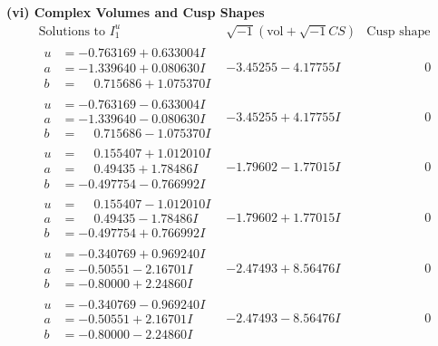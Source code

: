 \documentclass[1p]{elsarticle_modified}
\theoremstyle{definition}
\newcommand{\I}{\sqrt{-1}}
\begin{document}
\newpage\flushleft \textbf{(vi) Complex Volumes and Cusp Shapes}
$$\begin{array}{c|c|c}  
\text{Solutions to }I^u_{1}& \I (\text{vol} + \sqrt{-1}CS) & \text{Cusp shape}\\
 \hline 
\begin{aligned}
u &= -0.763169 + 0.633004 I \\
a &= -1.339640 + 0.080630 I \\
b &= \phantom{-}0.715686 + 1.075370 I\end{aligned}
 & -3.45255 - 4.17755 I & \phantom{-0.000000 } 0 \\ \hline\begin{aligned}
u &= -0.763169 - 0.633004 I \\
a &= -1.339640 - 0.080630 I \\
b &= \phantom{-}0.715686 - 1.075370 I\end{aligned}
 & -3.45255 + 4.17755 I & \phantom{-0.000000 } 0 \\ \hline\begin{aligned}
u &= \phantom{-}0.155407 + 1.012010 I \\
a &= \phantom{-}0.49435 + 1.78486 I \\
b &= -0.497754 - 0.766992 I\end{aligned}
 & -1.79602 - 1.77015 I & \phantom{-0.000000 } 0 \\ \hline\begin{aligned}
u &= \phantom{-}0.155407 - 1.012010 I \\
a &= \phantom{-}0.49435 - 1.78486 I \\
b &= -0.497754 + 0.766992 I\end{aligned}
 & -1.79602 + 1.77015 I & \phantom{-0.000000 } 0 \\ \hline\begin{aligned}
u &= -0.340769 + 0.969240 I \\
a &= -0.50551 - 2.16701 I \\
b &= -0.80000 + 2.24860 I\end{aligned}
 & -2.47493 + 8.56476 I & \phantom{-0.000000 } 0 \\ \hline\begin{aligned}
u &= -0.340769 - 0.969240 I \\
a &= -0.50551 + 2.16701 I \\
b &= -0.80000 - 2.24860 I\end{aligned}
 & -2.47493 - 8.56476 I & \phantom{-0.000000 } 0 \\ \hline\begin{aligned}

\end{aligned}
\end{array}$$
\end{document}
